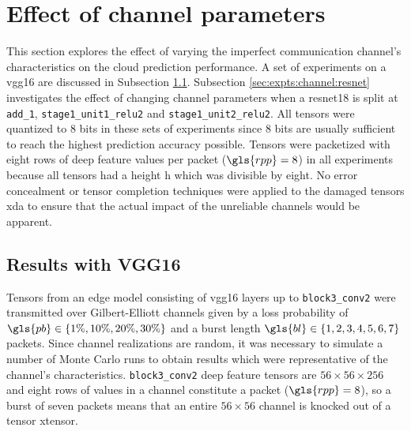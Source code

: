 
\section{Effect of channel parameters} \label{sec:expts:channel}
This section explores the effect of varying the imperfect communication channel's characteristics on the cloud prediction performance. A set of experiments on a \gls{vgg16} are discussed in Subsection \ref{sec:expts:channel:vgg16}. Subsection \ref{sec:expts:channel:resnet} investigates the effect of changing channel parameters when a \gls{resnet18} is split at \verb|add_1|, \verb|stage1_unit1_relu2| and \verb|stage1_unit2_relu2|. All tensors were quantized to 8 bits in these sets of experiments since 8 bits are usually sufficient to reach the highest prediction accuracy possible. Tensors were packetized with eight rows of deep feature values per packet ($\gls{rpp} = 8$) in all experiments because all tensors had a height \gls{h} which was divisible by eight. No error concealment or tensor completion techniques were applied to the damaged tensors \gls{xda} to ensure that the actual impact of the unreliable channels would be apparent.

\subsection{Results with VGG16} \label{sec:expts:channel:vgg16}
Tensors from an edge model consisting of \gls{vgg16} layers up to \verb|block3_conv2| were transmitted over Gilbert-Elliott channels given by a loss probability of $\gls{pb} \in \{1\%,10\%,20\%,30\%\}$ and a burst length $\gls{bl} \in \{1,2,3,4,5,6,7\}$ packets. Since channel realizations are random, it was necessary to simulate a number of Monte Carlo runs to obtain results which were representative of the channel's characteristics. \verb|block3_conv2| deep feature tensors are $56 \times 56 \times 256$ and eight rows of values in a channel constitute a packet ($\gls{rpp}=8$), so a burst of seven packets means that an entire $56 \times 56$ channel is knocked out of a tensor \gls{xtensor}.

